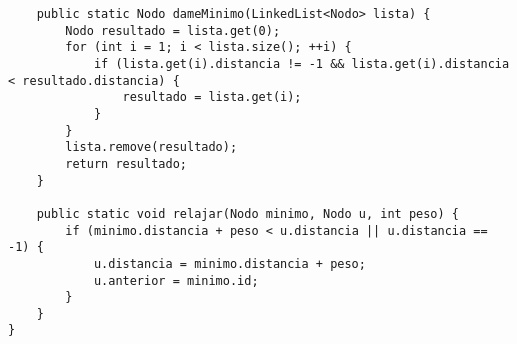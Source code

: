 \begin{lstlisting}
	public static Nodo dameMinimo(LinkedList<Nodo> lista) {
		Nodo resultado = lista.get(0);
		for (int i = 1; i < lista.size(); ++i) {
			if (lista.get(i).distancia != -1 && lista.get(i).distancia < resultado.distancia) {
				resultado = lista.get(i);
			}
		}
		lista.remove(resultado);
		return resultado;
	}
 
	public static void relajar(Nodo minimo, Nodo u, int peso) {
		if (minimo.distancia + peso < u.distancia || u.distancia == -1) {
			u.distancia = minimo.distancia + peso;
			u.anterior = minimo.id;
		}
	}
}
\end{lstlisting}